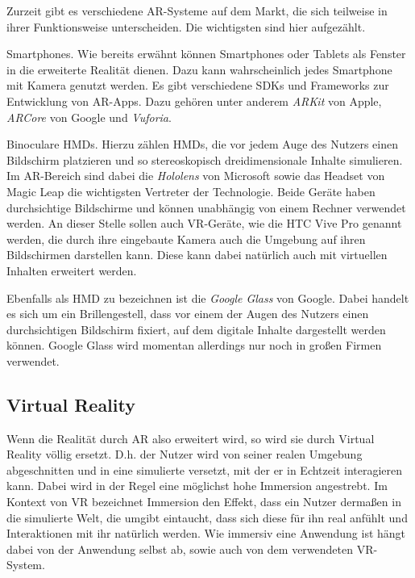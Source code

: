 Zurzeit gibt es verschiedene AR-Systeme auf dem Markt, die sich teilweise in ihrer Funktionsweise unterscheiden. Die wichtigsten sind hier aufgezählt.

Smartphones. Wie bereits erwähnt können Smartphones oder Tablets als Fenster in die erweiterte Realität dienen. Dazu kann wahrscheinlich jedes Smartphone mit Kamera genutzt werden. Es gibt verschiedene SDKs und Frameworks zur Entwicklung von AR-Apps. Dazu gehören unter anderem \textit{ARKit} von Apple, \textit{ARCore} von Google und \textit{Vuforia}.

Binoculare HMDs. Hierzu zählen HMDs, die vor jedem Auge des Nutzers einen Bildschirm platzieren und so stereoskopisch dreidimensionale Inhalte simulieren. Im AR-Bereich sind dabei die \textit{Hololens} von Microsoft sowie das Headset von Magic Leap die wichtigsten Vertreter der Technologie. Beide Geräte haben durchsichtige Bildschirme und können unabhängig von einem Rechner verwendet werden. 
An dieser Stelle sollen auch VR-Geräte, wie die HTC Vive Pro genannt werden, die durch ihre eingebaute Kamera auch die Umgebung auf ihren Bildschirmen darstellen kann. Diese kann dabei natürlich auch mit virtuellen Inhalten erweitert werden. 

Ebenfalls als HMD zu bezeichnen ist die \textit{Google Glass} von Google. Dabei handelt es sich um ein Brillengestell, dass vor einem der Augen des Nutzers einen durchsichtigen Bildschirm fixiert, auf dem digitale Inhalte dargestellt werden können. Google Glass wird momentan allerdings nur noch in großen Firmen verwendet.


\subsection{Virtual Reality}

Wenn die Realität durch AR also erweitert wird, so wird sie durch Virtual Reality völlig ersetzt. D.h. der Nutzer wird von seiner realen Umgebung abgeschnitten und in eine simulierte versetzt, mit der er in Echtzeit 
interagieren kann. Dabei wird in der Regel eine möglichst hohe Immersion angestrebt. 
Im Kontext von VR bezeichnet Immersion den Effekt, dass ein Nutzer dermaßen in die simulierte Welt, die umgibt eintaucht, dass sich diese für ihn real anfühlt und Interaktionen mit ihr natürlich werden. Wie immersiv eine Anwendung ist hängt dabei von der Anwendung selbst ab, sowie auch von dem verwendeten VR-System. 

